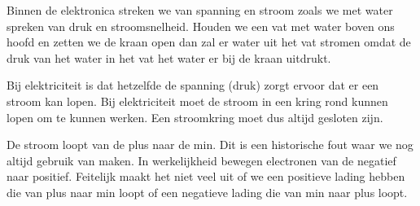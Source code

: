 Binnen de elektronica streken we van spanning en stroom zoals we met water spreken van druk en stroomsnelheid. Houden we een vat met water boven ons hoofd en zetten we de kraan open dan zal er water uit het vat stromen omdat de druk van het water in het vat het water er bij de kraan uitdrukt.

Bij elektriciteit is dat hetzelfde de spanning (druk) zorgt ervoor dat er een stroom kan lopen. Bij elektriciteit moet de stroom in een kring rond kunnen lopen om te kunnen werken. Een stroomkring moet dus altijd gesloten zijn.

De stroom loopt van de plus naar de min. Dit is een historische fout waar we nog altijd gebruik van maken. In werkelijkheid bewegen electronen van de negatief naar positief. Feitelijk maakt het niet veel uit of we een positieve lading hebben die van plus naar min loopt of een negatieve lading die van min naar plus loopt.

